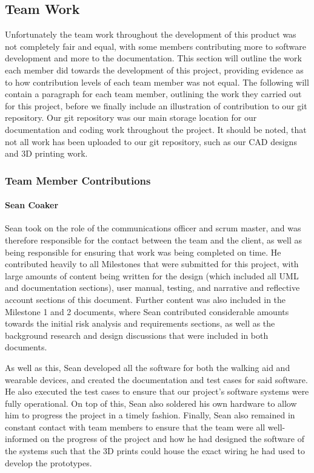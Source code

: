         \subsection{Team Work}

            Unfortunately the team work throughout the development of this product was not completely fair and equal, with some members contributing more to software development and more to the documentation. This section will outline the work each member did towards the development of this project, providing evidence as to how contribution levels of each team member was not equal. The following will contain a paragraph for each team member, outlining the work they carried out for this project, before we finally include an illustration of contribution to our git repository. Our git repository was our main storage location for our documentation and coding work throughout the project. It should be noted, that not all work has been uploaded to our git repository, such as our CAD designs and 3D printing work.

            \subsubsection{Team Member Contributions}

                \paragraph{Sean Coaker}\mbox{}

                Sean took on the role of the communications officer and scrum master, and was therefore responsible for the contact between the team and the client, as well as being responsible for ensuring that work was being completed on time. He contributed heavily to all Milestones that were submitted for this project, with large amounts of content being written for the design (which included all UML and documentation sections), user manual, testing, and narrative and reflective account sections of this document. Further content was also included in the Milestone 1 and 2 documents, where Sean contributed considerable amounts towards the initial risk analysis and requirements sections, as well as the background research and design discussions that were included in both documents.

                As well as this, Sean developed all the software for both the walking aid and wearable devices, and created the documentation and test cases for said software. He also executed the test cases to ensure that our project's software systems were fully operational. On top of this, Sean also soldered his own hardware to allow him to progress the project in a timely fashion. Finally, Sean also remained in constant contact with team members to ensure that the team were all well-informed on the progress of the project and how he had designed the software of the systems such that the 3D prints could house the exact wiring he had used to develop the prototypes.


